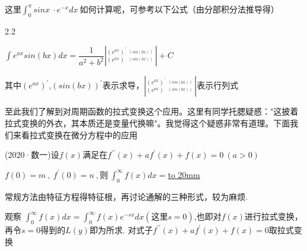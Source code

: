 \documentclass[12pt]{report}
\begin{document}
 
  这里$\int_{0}^{\pi}sinx\:\cdot e^{-x}dx\:$如何计算呢，可参考以下公式（由分部积分法推导得）
  
  \vspace{-7pt}
  
  \begin{spacing}{2.2}
  	 \begin{center}
  		$\int e^{ax}sin\left(bx\right)dx=\dfrac{1}{a^{2}+b^{2}}\left|_{\left(e^{ax}\right)}^{\left(e^{ax}\right)^{\prime}}\:_{^{\left(sin\left(bx\right)\right)}}^{^{\left(sin\left(bx\right)\right)^{\prime}}}\right|+C$ 
  		
  		其中$\left(e^{ax}\right)^{\prime}$,$\left(sin\left(bx\right)\right)^{\prime}$表示求导，$\left|_{\left(e^{ax}\right)}^{\left(e^{ax}\right)^{\prime}}\:_{^{\left(sin\left(bx\right)\right)}}^{^{\left(sin\left(bx\right)\right)^{\prime}}}\right|$表示行列式
  	\end{center}
  \end{spacing}
  
  \vspace{-10pt}
 
  至此我们了解到对周期函数的拉式变换这个应用。这里有同学托腮疑惑："这披着拉式变换的外衣，其本质还是变量代换嘛"。我觉得这个疑惑非常有道理。下面我们来看拉式变换在微分方程中的应用
  
  
  \clearpage
  
   (2020·数一)设$f(x)$满足在$f^{\prime\prime}\left(x\right)+af^{\prime}\left(x\right)+f\left(x\right)=0\:\left(a>0\right)$
  
  \hspace{3em}$f\left(0\right)=m\:,\:f^{\prime}\left(0\right)=n\:,则\:\int_{0}^{\infty}f\left(x\right)dx=$\underline{\hbox to 20mm{}}
   
   \vspace{10pt}
   
    常规方法由特征方程得特征根，再讨论通解的三种形式，较为麻烦.
   
   观察 $\int_{0}^{\infty}f\left(x\right)dx=\int_{0}^{\infty}f\left(x\right)e^{-sx}dx (这里s=0)$,也即对$f(x)$进行拉式变换，再令$s=0$得到的$L(y)$即为所求. 对式子$f^{\prime\prime}\left(x\right)+af^{\prime}\left(x\right)+f\left(x\right)=0$取拉式变换
   
   \vspace{-10pt}
   
\end{document}
